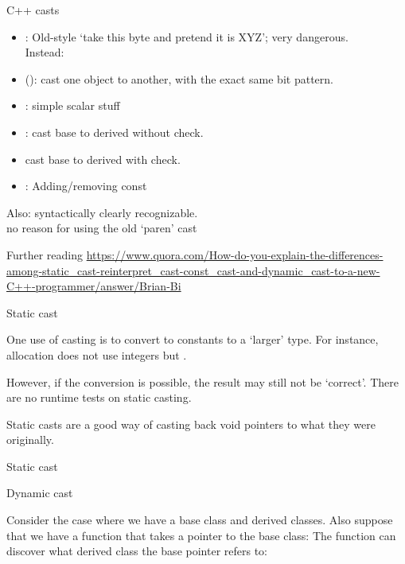 \begin{slide}{C++ casts}
  \label{sl:cpp-casts}
  \begin{itemize}
  \item {}: 
    Old-style `take this byte and pretend it is XYZ'; very dangerous.\\
    Instead:
  \item {} (): cast one object to another,
    with the exact same bit pattern.
  \item {}: simple scalar stuff
  \item {}: cast base to derived without check.
  \item {} cast base to derived with check.
  \item {}: Adding/removing const
  \end{itemize}

  Also: syntactically clearly recognizable.\\
  no reason for using the old `paren' cast
\end{slide}

Further reading \url{https://www.quora.com/How-do-you-explain-the-differences-among-static_cast-reinterpret_cast-const_cast-and-dynamic_cast-to-a-new-C++-programmer/answer/Brian-Bi}

 {Static cast}
\label{sec:cast-static}

One use of casting is to convert to constants to a `larger' type. For
instance, allocation does not use integers but .


However, if the
conversion is possible, the result may still not be `correct'.
%
%
There are no runtime tests on static casting.

Static casts are a good way of casting back void pointers to what they
were originally.

\begin{slide}{Static cast}
  \label{sl:const-cast}
\end{slide}

 {Dynamic cast}

Consider the case where we have a base class and derived classes.
%
%
Also suppose that we have a function that takes a pointer to the base
class:
%
%
The function can discover what derived class the base pointer refers
to:
%

